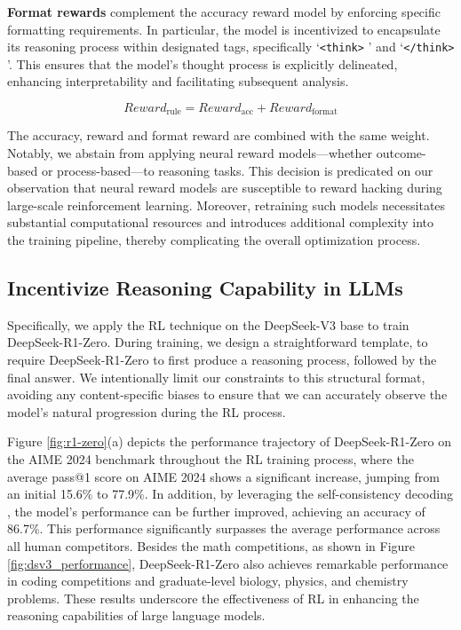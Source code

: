 \textbf{Format rewards} complement the accuracy reward model by enforcing specific formatting requirements. In particular, the model is incentivized to encapsulate its reasoning process within designated tags, specifically `\texttt{<think>} ' and `\texttt{</think>} '. This ensures that the model's thought process is explicitly delineated, enhancing interpretability and facilitating subsequent analysis.

\begin{equation}
    Reward_\text{rule} = Reward_\text{acc} + Reward_\text{format}
\end{equation}

The accuracy, reward and format reward are combined with the same weight. Notably, we abstain from applying neural reward models—whether outcome-based or process-based—to reasoning tasks. This decision is predicated on our observation that neural reward models are susceptible to reward hacking during large-scale reinforcement learning. Moreover, retraining such models necessitates substantial computational resources and introduces additional complexity into the training pipeline, thereby complicating the overall optimization process.

\subsection{Incentivize Reasoning Capability in LLMs} Specifically, we apply the RL technique on the DeepSeek-V3 base to train DeepSeek-R1-Zero. During training, we design a straightforward template, to require DeepSeek-R1-Zero to first produce a reasoning process, followed by the final answer. We intentionally limit our constraints to this structural format, avoiding any content-specific biases to ensure that we can accurately observe the model's natural progression during the RL process.

Figure \ref{fig:r1-zero}(a) depicts the performance trajectory of DeepSeek-R1-Zero on the AIME 2024 benchmark throughout the RL training process, where the average pass@1 score on AIME 2024 shows a significant increase, jumping from an initial 15.6\% to 77.9\%.
In addition, by leveraging the self-consistency decoding \citep{wangself}, the model's performance can be further improved, achieving an accuracy of 86.7\%. This performance significantly surpasses the average performance across all human competitors. Besides the math competitions, as shown in Figure \ref{fig:dsv3_performance}, DeepSeek-R1-Zero also achieves remarkable performance in coding competitions and graduate-level biology, physics, and chemistry problems. These results underscore the effectiveness of RL in enhancing the reasoning capabilities of large language models.


